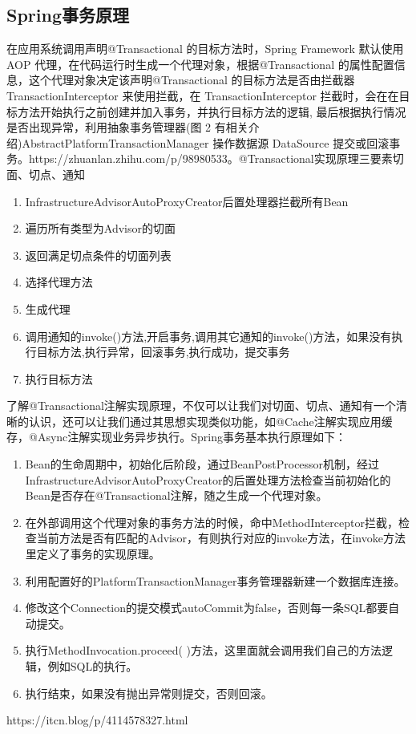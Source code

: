 \documentclass[../../../interview-questions.tex]{subfiles}
\begin{document}
\subsection{Spring事务原理}

在应用系统调用声明@Transactional 的目标方法时，Spring Framework 默认使用 AOP 代理，在代码运行时生成一个代理对象，根据@Transactional 的属性配置信息，这个代理对象决定该声明@Transactional 的目标方法是否由拦截器 TransactionInterceptor 来使用拦截，在 TransactionInterceptor 拦截时，会在在目标方法开始执行之前创建并加入事务，并执行目标方法的逻辑, 最后根据执行情况是否出现异常，利用抽象事务管理器(图 2 有相关介绍)AbstractPlatformTransactionManager 操作数据源 DataSource 提交或回滚事务。https://zhuanlan.zhihu.com/p/98980533。@Transactional实现原理三要素切面、切点、通知

\begin{enumerate}
    \item {InfrastructureAdvisorAutoProxyCreator后置处理器拦截所有Bean}
    \item {遍历所有类型为Advisor的切面}
    \item {返回满足切点条件的切面列表}
    \item {选择代理方法}
    \item {生成代理}
    \item {调用通知的invoke()方法,开启事务,调用其它通知的invoke()方法，如果没有执行目标方法,执行异常，回滚事务,执行成功，提交事务}
    \item {执行目标方法}
\end{enumerate}

了解@Transactional注解实现原理，不仅可以让我们对切面、切点、通知有一个清晰的认识，还可以让我们通过其思想实现类似功能，如@Cache注解实现应用缓存，@Async注解实现业务异步执行。Spring事务基本执行原理如下：

\begin{enumerate}
    \item {Bean的生命周期中，初始化后阶段，通过BeanPostProcessor机制，经过InfrastructureAdvisorAutoProxyCreator的后置处理方法检查当前初始化的Bean是否存在@Transactional注解，随之生成一个代理对象。}
    \item {在外部调用这个代理对象的事务方法的时候，命中MethodInterceptor拦截，检查当前方法是否有匹配的Advisor，有则执行对应的invoke方法，在invoke方法里定义了事务的实现原理。}
    \item {利用配置好的PlatformTransactionManager事务管理器新建一个数据库连接。}
    \item {修改这个Connection的提交模式autoCommit为false，否则每一条SQL都要自动提交。}
    \item {执行MethodInvocation.proceed( )方法，这里面就会调用我们自己的方法逻辑，例如SQL的执行。}
    \item {执行结束，如果没有抛出异常则提交，否则回滚。}
\end{enumerate}

https://itcn.blog/p/4114578327.html
\end{document}
